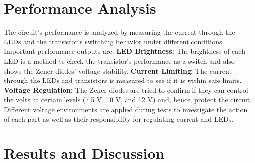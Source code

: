 \section{Performance Analysis}

The circuit's performance is analyzed by measuring the current through the LEDs and the transistor's switching behavior under different conditions. Important performance outputs are:
\newline \textbf{LED Brightness:} The brightness of each LED is a method to check the transistor's performance as a switch and also shows the Zener diodes' voltage stability.\cite{b13}
\newline \textbf{Current Limiting:} The current through the LEDs and transistors is measured to see if it is within safe limits.\cite{9}
\newline \textbf{Voltage Regulation:} The Zener diodes are tried to confirm if they can control the volts at certain levels (7.5 V, 10 V, and 12 V) and, hence, protect the circuit.\cite{8}
\newline Different voltage environments are applied during tests to investigate the action of each part as well as their responsibility for regulating current and LEDs.

\section{Results and Discussion}

